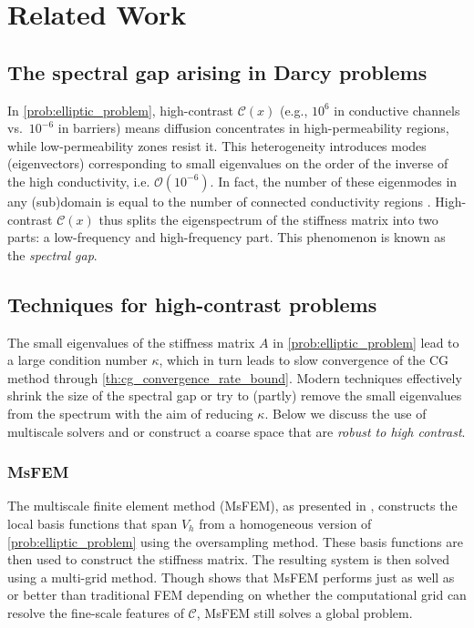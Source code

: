 \chapter{Related Work}\label{ch:literature}
\section{The spectral gap arising in Darcy problems}\label{sec:spectral_gap_darcy}
In \cref{prob:elliptic_problem}, high-contrast $\mathcal{C}(x)$ (e.g., $10^6$ in conductive channels vs.\ $ 10^{-6} $ in barriers) means diffusion concentrates in high-permeability regions, while low-permeability zones resist it. This heterogeneity introduces modes (eigenvectors) corresponding to small eigenvalues on the order of the inverse of the high conductivity, i.e. $\mathcal{O}(10^{-6})$. In fact, the number of these eigenmodes in any (sub)domain is equal to the number of connected conductivity regions \cite{ddp_for_multiscale_flows_in_high_contrast_media_Galvis2010}. High-contrast $\mathcal{C}(x)$ thus splits the eigenspectrum of the stiffness matrix into two parts: a low-frequency and high-frequency part. This phenomenon is known as the \textit{spectral gap}.

\section{Techniques for high-contrast problems}\label{sec:tailored_coarse_spaces}
The small eigenvalues of the stiffness matrix $A$ in \cref{prob:elliptic_problem} lead to a large condition number $\kappa$, which in turn leads to slow convergence of the CG method through \cref{th:cg_convergence_rate_bound}. Modern techniques effectively shrink the size of the spectral gap or try to (partly) remove the small eigenvalues from the spectrum with the aim of reducing $\kappa$. Below we discuss the use of multiscale solvers and or construct a coarse space that are \textit{robust to high contrast}. 

\subsection{MsFEM} 
The multiscale finite element method (MsFEM), as presented in \cite{og_msfem_Hou1997}, constructs the local basis functions that span $V_h$ from a homogeneous version of \cref{prob:elliptic_problem} using the oversampling method. These basis functions are then used to construct the stiffness matrix. The resulting system is then solved using a multi-grid method. Though \citeauthor{og_msfem_Hou1997} shows that MsFEM performs just as well as or better than traditional FEM depending on whether the computational grid can resolve the fine-scale features of $\mathcal{C}$, MsFEM still solves a global problem. 

